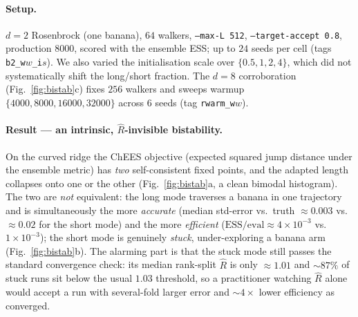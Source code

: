 \documentclass[11pt]{article}
\begin{document}
\paragraph{Setup.} $d{=}2$ Rosenbrock (one banana), $64$ walkers,
\texttt{--max-L 512}, \texttt{--target-accept 0.8}, production $8000$, scored with
the ensemble ESS; up to $24$ seeds per cell (tags \texttt{b2\_w$w$\_i$s$}). We
also varied the initialisation scale over $\{0.5,1,2,4\}$, which did not
systematically shift the long/short fraction. The $d{=}8$ corroboration
(Fig.~\ref{fig:bistab}c) fixes $256$ walkers and sweeps warmup
$\{4000,8000,16000,32000\}$ across $6$ seeds (tag \texttt{rwarm\_w$w$}).

\paragraph{Result --- an intrinsic, $\hat R$-invisible bistability.}
On the curved ridge the ChEES objective (expected squared jump distance under the
ensemble metric) has \emph{two} self-consistent fixed points, and the
adapted length collapses onto one or the other (Fig.~\ref{fig:bistab}a, a clean
bimodal histogram). The two are \emph{not} equivalent: the long mode traverses a
banana in one trajectory and is simultaneously the more \emph{accurate} (median
std-error vs.\ truth $\approx0.003$ vs.\ $\approx0.02$ for the short mode) and
the more \emph{efficient} ($\text{ESS}/\text{eval}\approx4\times10^{-3}$ vs.\ $1\times10^{-3}$);
the short mode is genuinely \emph{stuck}, under-exploring a banana arm
(Fig.~\ref{fig:bistab}b). The alarming part is that the stuck mode still passes
the standard convergence check: its median rank-split $\hat R$ is only
$\approx1.01$ and $\sim\!87\%$ of stuck runs sit below the usual $1.03$
threshold, so a practitioner watching $\hat R$ alone would accept a run with
several-fold larger error and $\sim\!4\times$ lower efficiency as converged.
\end{document}
